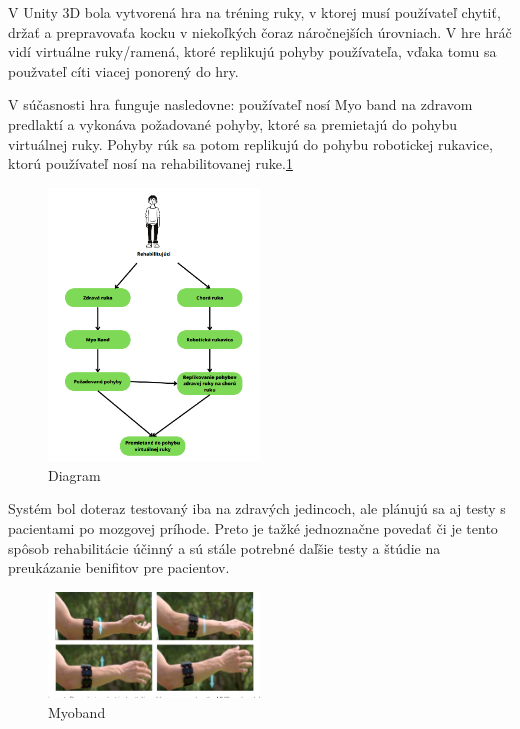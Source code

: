 \documentclass[10pt,twoside,slovak,a4paper]{article}
\begin{document}
V Unity 3D bola vytvorená hra na tréning ruky, v ktorej musí používateľ chytiť, držať a prepravovaťa kocku v niekoľkých čoraz náročnejších úrovniach. V hre hráč vidí virtuálne ruky/ramená, ktoré replikujú pohyby používateľa, vďaka tomu sa použvateľ cíti viacej ponorený do hry. 

V súčasnosti hra funguje nasledovne: používateľ nosí Myo band na zdravom predlaktí a vykonáva požadované pohyby, ktoré sa premietajú do pohybu virtuálnej ruky.
Pohyby rúk sa potom replikujú  do pohybu robotickej rukavice, ktorú používateľ nosí na rehabilitovanej ruke.\ref{fig:Diagram}

\begin{figure}[H]
    \centering
    \includegraphics[width = 0.5\textwidth]{obrazky/Diagram.png}
    \caption{Diagram}
    \label{fig:Diagram}
\end{figure}
 
Systém bol doteraz testovaný iba na zdravých jedincoch, ale plánujú sa aj testy s pacientami po mozgovej príhode. Preto je tažké jednoznačne povedať či je tento spôsob rehabilitácie účinný a  sú stále potrebné daľšie testy a štúdie na preukázanie benifitov pre pacientov.

\begin{figure}[H]
    \centering
    \includegraphics[width = 0.5\textwidth]{obrazky/Myoband.png}
    \caption{Myoband}
    \label{fig:Myoband pohyby}
\end{figure}
\end{document}
